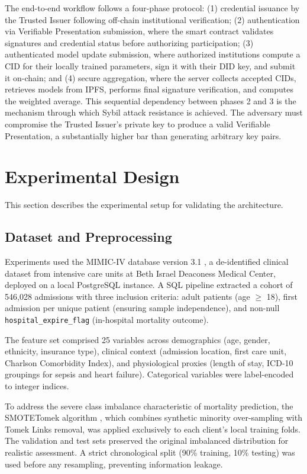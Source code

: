 \documentclass[english]{sbc2025}
\begin{document}
The end-to-end workflow follows a four-phase protocol: (1) credential issuance by the Trusted Issuer following off-chain institutional verification; (2) authentication via Verifiable Presentation submission, where the smart contract validates signatures and credential status before authorizing participation; (3) authenticated model update submission, where authorized institutions compute a CID for their locally trained parameters, sign it with their DID key, and submit it on-chain; and (4) secure aggregation, where the server collects accepted CIDs, retrieves models from IPFS, performs final signature verification, and computes the weighted average. This sequential dependency between phases 2 and 3 is the mechanism through which Sybil attack resistance is achieved. The adversary must compromise the Trusted Issuer's private key to produce a valid Verifiable Presentation, a substantially higher bar than generating arbitrary key pairs.


\section{Experimental Design}
\label{sec:methods}

This section describes the experimental setup for validating the architecture.

\subsection{Dataset and Preprocessing}

Experiments used the MIMIC-IV database version 3.1 \citep{johnson2020mimic}, a de-identified clinical dataset from intensive care units at Beth Israel Deaconess Medical Center, deployed on a local PostgreSQL instance. A SQL pipeline extracted a cohort of 546,028 admissions with three inclusion criteria: adult patients (age $\geq$ 18), first admission per unique patient (ensuring sample independence), and non-null \texttt{hospital\_expire\_flag} (in-hospital mortality outcome).

The feature set comprised 25 variables across demographics (age, gender, ethnicity, insurance type), clinical context (admission location, first care unit, Charlson Comorbidity Index), and physiological proxies (length of stay, ICD-10 groupings for sepsis and heart failure). Categorical variables were label-encoded to integer indices.

To address the severe class imbalance characteristic of mortality prediction, the SMOTETomek algorithm \citep{batista2004balancing}, which combines synthetic minority over-sampling with Tomek Links removal, was applied exclusively to each client's local training folds. The validation and test sets preserved the original imbalanced distribution for realistic assessment. A strict chronological split (90\% training, 10\% testing) was used before any resampling, preventing information leakage.
\end{document}
